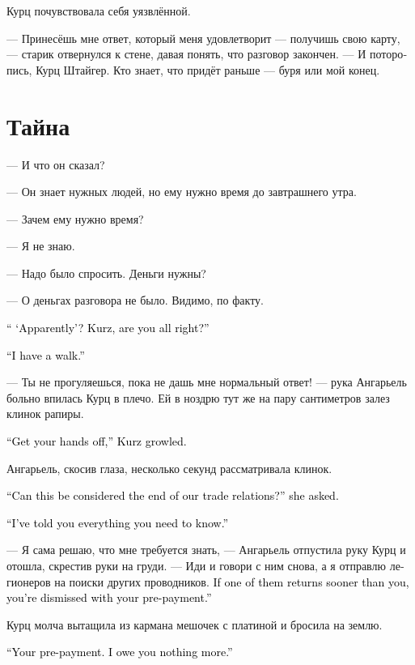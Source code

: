 \documentclass[a4paper,12pt,fleqn]{book}\usepackage{cooltooltips}\usepackage{polyglossia}\setdefaultlanguage[babelshorthands=true]{russian}\setotherlanguage{english}\defaultfontfeatures{Ligatures=TeX,Mapping=tex-text} \usepackage{xcolor}\definecolor{lightgray}{HTML}{bbbbbb}\color{lightgray}\newcommand{\ml}[3]{\textenglish{\textcolor{black}{#3}}}
\begin{document}
Курц почувствовала себя уязвлённой.

--- Принесёшь мне ответ, который меня удовлетворит --- получишь свою карту, --- старик отвернулся к стене, давая понять, что разговор закончен.
--- И поторопись, Курц Штайгер.
Кто знает, что придёт раньше --- буря или мой конец.

\section{Тайна}

--- И что он сказал?

--- Он знает нужных людей, но ему нужно время до завтрашнего утра.

--- Зачем ему нужно время?

--- Я не знаю.

--- Надо было спросить.
Деньги нужны?

--- О деньгах разговора не было.
Видимо, по факту.

\ml{$0$}
{--- <<Видимо>>?}
{`` `Apparently'?}
\ml{$0$}
{Курц, с тобой всё в порядке?}
{Kurz, are you all right?''}

\ml{$0$}
{--- Я прогуляюсь.}
{``I have a walk.''}

--- Ты не прогуляешься, пока не дашь мне нормальный ответ! --- рука Ангарьель больно впилась Курц в плечо.
Ей в ноздрю тут же на пару сантиметров залез клинок рапиры.

\ml{$0$}
{--- Убери руки, --- прорычала Курц.}
{``Get your hands off,'' Kurz growled.}

Ангарьель, скосив глаза, несколько секунд рассматривала клинок.

\ml{$0$}
{--- Это можно считать окончанием наших торговых отношений? --- осведомилась она.}
{``Can this be considered the end of our trade relations?'' she asked.}

\ml{$0$}
{--- Я тебе сказала всё, что тебе требуется знать.}
{``I've told you everything you need to know.''}

--- Я сама решаю, что мне требуется знать, --- Ангарьель отпустила руку Курц и отошла, скрестив руки на груди.
--- Иди и говори с ним снова, а я отправлю легионеров на поиски других проводников.
\ml{$0$}
{Если они вернутся раньше тебя --- ты свободна, предоплата у тебя на руках.}
{If one of them returns sooner than you, you're dismissed with your pre-payment.''}

Курц молча вытащила из кармана мешочек с платиной и бросила на землю.

\ml{$0$}
{--- Твоя предоплата.}
{``Your pre-payment.}
\ml{$0$}
{Больше я тебе ничем не обязана.}
{I owe you nothing more.''}
\end{document}
